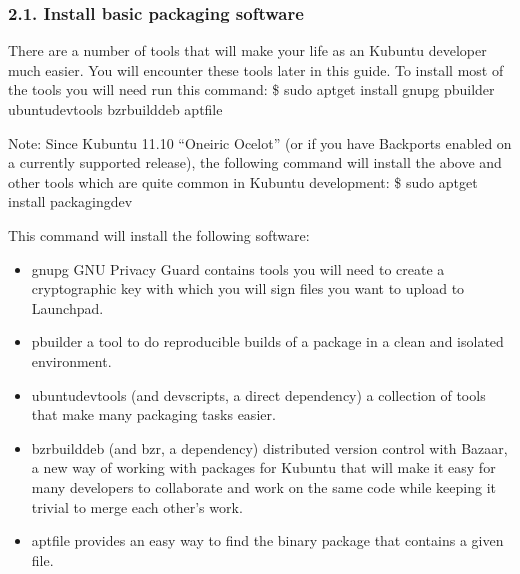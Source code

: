 \documentclass[letterpaper,10pt,english]{sphinxmanual}
\begin{document}
\subsubsection{2.1. Install basic packaging software}
\label{\detokenize{docs/packaging-guide/getting-started:install-basic-packaging-software}}
\sphinxAtStartPar
There are a number of tools that will make your life as an Kubuntu developer much easier. You will encounter these tools later in this guide. To install most of the tools you will need run this command:
\$ sudo apt\sphinxhyphen{}get install gnupg pbuilder ubuntu\sphinxhyphen{}dev\sphinxhyphen{}tools bzr\sphinxhyphen{}builddeb apt\sphinxhyphen{}file

\sphinxAtStartPar
Note: Since Kubuntu 11.10 “Oneiric Ocelot” (or if you have Backports enabled on a currently supported release), the following command will install the above and other tools which are quite common in Kubuntu development:
\$ sudo apt\sphinxhyphen{}get install packaging\sphinxhyphen{}dev

\sphinxAtStartPar
This command will install the following software:
\begin{itemize}
\item {} 
\sphinxAtStartPar
gnupg \textendash{} GNU Privacy Guard contains tools you will need to create a cryptographic key with which you will sign files you want to upload to Launchpad.

\item {} 
\sphinxAtStartPar
pbuilder \textendash{} a tool to do reproducible builds of a package in a clean and isolated environment.

\item {} 
\sphinxAtStartPar
ubuntu\sphinxhyphen{}dev\sphinxhyphen{}tools (and devscripts, a direct dependency) \textendash{} a collection of tools that make many packaging tasks easier.

\item {} 
\sphinxAtStartPar
bzr\sphinxhyphen{}builddeb (and bzr, a dependency) \textendash{} distributed version control with Bazaar, a new way of working with packages for Kubuntu that will make it easy for many developers to collaborate and work on the same code while keeping it trivial to merge each other’s work.

\item {} 
\sphinxAtStartPar
apt\sphinxhyphen{}file provides an easy way to find the binary package that contains a given file.

\end{itemize}
\end{document}
